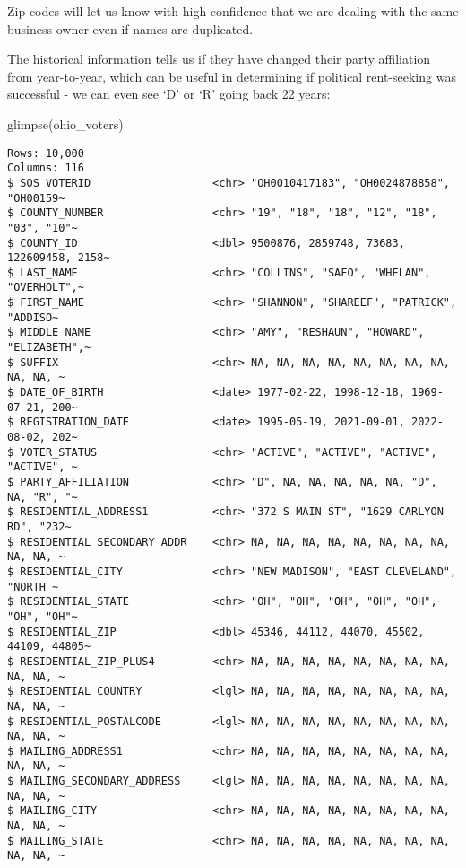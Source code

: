 \documentclass[
  letterpaper,
  DIV=11,
  numbers=noendperiod]{scrartcl}
\newenvironment{Shaded}{\begin{snugshade}}{\end{snugshade}}
\newcommand{\FunctionTok}[1]{\textcolor[rgb]{0.28,0.35,0.67}{#1}}
\newcommand{\NormalTok}[1]{\textcolor[rgb]{0.00,0.23,0.31}{#1}}
\begin{document}
Zip codes will let us know with high confidence that we are dealing with
the same business owner even if names are duplicated.

The historical information tells us if they have changed their party
affiliation from year-to-year, which can be useful in determining if
political rent-seeking was successful - we can even see `D' or `R' going
back 22 years:

\begin{Shaded}
\begin{Highlighting}[]
\FunctionTok{glimpse}\NormalTok{(ohio\_voters)}
\end{Highlighting}
\end{Shaded}

\begin{verbatim}
Rows: 10,000
Columns: 116
$ SOS_VOTERID                   <chr> "OH0010417183", "OH0024878858", "OH00159~
$ COUNTY_NUMBER                 <chr> "19", "18", "18", "12", "18", "03", "10"~
$ COUNTY_ID                     <dbl> 9500876, 2859748, 73683, 122609458, 2158~
$ LAST_NAME                     <chr> "COLLINS", "SAFO", "WHELAN", "OVERHOLT",~
$ FIRST_NAME                    <chr> "SHANNON", "SHAREEF", "PATRICK", "ADDISO~
$ MIDDLE_NAME                   <chr> "AMY", "RESHAUN", "HOWARD", "ELIZABETH",~
$ SUFFIX                        <chr> NA, NA, NA, NA, NA, NA, NA, NA, NA, NA, ~
$ DATE_OF_BIRTH                 <date> 1977-02-22, 1998-12-18, 1969-07-21, 200~
$ REGISTRATION_DATE             <date> 1995-05-19, 2021-09-01, 2022-08-02, 202~
$ VOTER_STATUS                  <chr> "ACTIVE", "ACTIVE", "ACTIVE", "ACTIVE", ~
$ PARTY_AFFILIATION             <chr> "D", NA, NA, NA, NA, NA, "D", NA, "R", "~
$ RESIDENTIAL_ADDRESS1          <chr> "372 S MAIN ST", "1629 CARLYON RD", "232~
$ RESIDENTIAL_SECONDARY_ADDR    <chr> NA, NA, NA, NA, NA, NA, NA, NA, NA, NA, ~
$ RESIDENTIAL_CITY              <chr> "NEW MADISON", "EAST CLEVELAND", "NORTH ~
$ RESIDENTIAL_STATE             <chr> "OH", "OH", "OH", "OH", "OH", "OH", "OH"~
$ RESIDENTIAL_ZIP               <dbl> 45346, 44112, 44070, 45502, 44109, 44805~
$ RESIDENTIAL_ZIP_PLUS4         <chr> NA, NA, NA, NA, NA, NA, NA, NA, NA, NA, ~
$ RESIDENTIAL_COUNTRY           <lgl> NA, NA, NA, NA, NA, NA, NA, NA, NA, NA, ~
$ RESIDENTIAL_POSTALCODE        <lgl> NA, NA, NA, NA, NA, NA, NA, NA, NA, NA, ~
$ MAILING_ADDRESS1              <chr> NA, NA, NA, NA, NA, NA, NA, NA, NA, NA, ~
$ MAILING_SECONDARY_ADDRESS     <lgl> NA, NA, NA, NA, NA, NA, NA, NA, NA, NA, ~
$ MAILING_CITY                  <chr> NA, NA, NA, NA, NA, NA, NA, NA, NA, NA, ~
$ MAILING_STATE                 <chr> NA, NA, NA, NA, NA, NA, NA, NA, NA, NA, ~

\end{verbatim}
\end{document}
